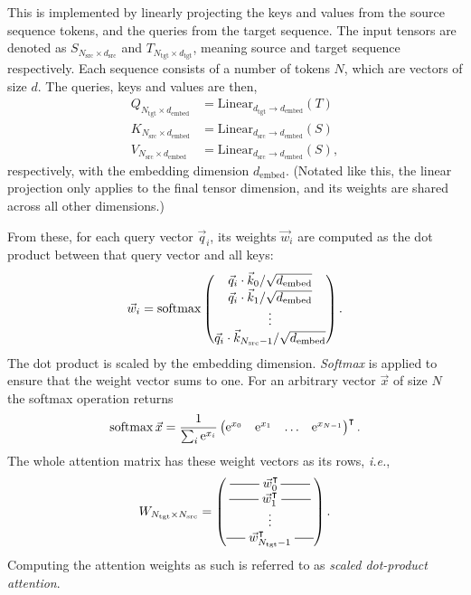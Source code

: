 This is implemented by linearly projecting the keys and values from the source sequence tokens, and the queries from the target sequence. The input tensors are denoted as $S_{N_\text{src}\times d_\text{src}}$ and $T_{N_\text{tgt}\times d_\text{tgt}}$, meaning source and target sequence respectively. Each sequence consists of a number of tokens $N$, which are vectors of size $d$. The queries, keys and values are then,
\begin{align}
	Q_{N_\text{tgt}\times d_\text{embed}} &= \text{Linear}_{d_\text{tgt} \rightarrow d_\text{embed}}(T) 
	\label{eq:machine_learning:q_proj} \\
	K_{N_\text{src}\times d_\text{embed}} &= \text{Linear}_{d_\text{src} \rightarrow d_\text{embed}}(S) 
	\label{eq:machine_learning:k_proj} \\
	V_{N_\text{src}\times d_\text{embed}} &= \text{Linear}_{d_\text{src} \rightarrow d_\text{embed}}(S)
	\label{eq:machine_learning:v_proj},
\end{align}
respectively, with the embedding dimension $d_\text{embed}$. (Notated like this, the linear projection only applies to the final tensor dimension, and its weights are shared across all other dimensions.)

From these, for each query vector $\vec{q}_i$, its weights $\vec{w}_i$ are computed as the dot product between that query vector and all keys:
\begin{equation}
	\vec{w}_i = \operatorname*{softmax}\begin{pmatrix} 
		\vec{q}_i\cdot\vec{k}_0/\sqrt{d_\text{embed}} \\
		\vec{q}_i\cdot\vec{k}_1/\sqrt{d_\text{embed}} \\
		\vdots \\
		\vec{q}_i\cdot\vec{k}_{N_\text{src}-1}/\sqrt{d_\text{embed}}
	\end{pmatrix}.
\end{equation}
The dot product is scaled by the embedding dimension. \emph{Softmax} is applied to ensure that the weight vector sums to one. For an arbitrary vector $\vec{x}$ of size $N$ the softmax operation returns
\begin{equation}
	\operatorname*{softmax}{\vec{x}} = \frac{1}{\sum_i \mathrm{e}^{x_i}} \begin{pmatrix}
		\mathrm{e}^{x_0} & \mathrm{e}^{x_1} & \dots & \mathrm{e}^{x_{N-1}}
	\end{pmatrix}^\intercal.
\end{equation}
The whole attention matrix has these weight vectors as its rows, \emph{i.e.},
\begin{equation}
	W_{N_\text{tgt}\times N_\text{src}} = \begin{pmatrix}
		\rule[0.5ex]{2.33em}{0.48pt}\;
		\vec{w}_0^\intercal 
		\,\rule[0.5ex]{2.33em}{0.48pt} \\
		\rule[0.5ex]{2.33em}{0.48pt}\; 
		\vec{w}_1^\intercal 
		\;\rule[0.5ex]{2.33em}{0.48pt} \\
		\vdots \\
		\rule[0.5ex]{1.5em}{0.48pt}\; 
		\vec{w}_{N_\text{tgt}-1}^\intercal 
		\;\rule[0.5ex]{1.5em}{0.48pt}
	\end{pmatrix}.
\end{equation}
Computing the attention weights as such is referred to as \emph{scaled dot-product attention}.

